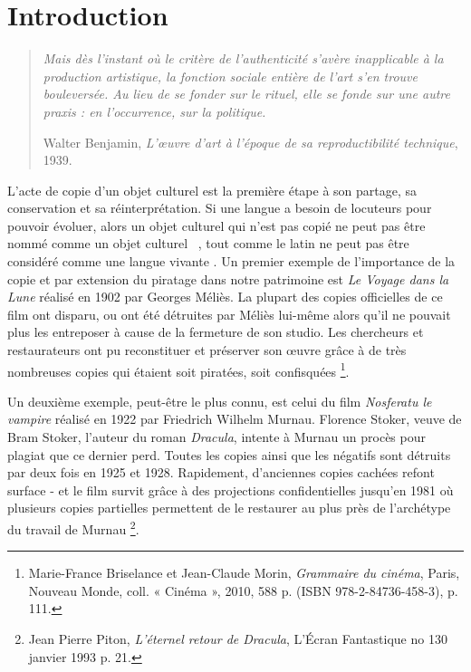 \chapter{Introduction}


\begin{quote}
    \textit{Mais dès l'instant où le critère de l'authenticité s'avère inapplicable à la production artistique, la fonction sociale entière de l'art s'en trouve bouleversée. Au lieu de se fonder sur le rituel, elle se fonde sur une autre praxis : en l'occurrence, sur la politique.}
    
    Walter Benjamin, \textit{L'\oe uvre d'art à l'époque de sa reproductibilité technique}, 1939.
\end{quote}

L'acte de copie d'un objet culturel est la première étape à son partage, sa conservation et sa réinterprétation. Si une langue a besoin de locuteurs pour pouvoir évoluer, alors un objet culturel qui n'est pas copié ne peut pas être nommé comme un \guillemetleft objet culturel \guillemetright ~, tout comme le latin ne peut pas être considéré comme une \guillemetleft langue vivante \guillemetright. Un premier exemple de l'importance de la copie et par extension du piratage dans notre patrimoine est \textit{Le Voyage dans la Lune} réalisé en 1902 par Georges Méliès. La plupart des copies officielles de ce film ont disparu, ou ont été détruites par Méliès lui-même alors qu'il ne pouvait plus les entreposer à cause de la fermeture de son studio. Les chercheurs et restaurateurs ont pu reconstituer et préserver son œuvre grâce à de très nombreuses copies qui étaient soit piratées, soit confisquées \footnote{Marie-France Briselance et Jean-Claude Morin, \textit{Grammaire du cinéma}, Paris, Nouveau Monde, coll. « Cinéma », 2010, 588 p. (ISBN 978-2-84736-458-3), p. 111.}.

Un deuxième exemple, peut-être le plus connu, est celui du film \textit{Nosferatu le vampire} réalisé en 1922 par Friedrich Wilhelm Murnau. Florence Stoker, veuve de Bram Stoker, l'auteur du roman \textit{Dracula}, intente à Murnau un procès pour plagiat que ce dernier perd. Toutes les copies ainsi que les négatifs sont détruits par deux fois en 1925 et 1928. Rapidement, d'anciennes copies cachées refont surface - et le film survit grâce à des projections confidentielles jusqu'en 1981 où plusieurs copies partielles permettent de le restaurer au plus près de l'archétype du travail de Murnau \footnote{Jean Pierre Piton, \textit{L'éternel retour de Dracula}, L'Écran Fantastique no 130 janvier 1993 p. 21.}.

